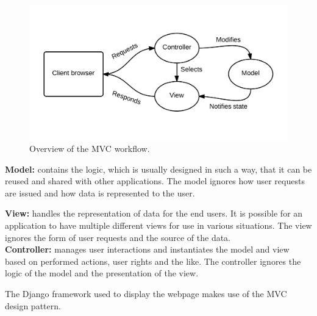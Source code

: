 \begin{figure}[ht]
\includegraphics[width=\textwidth]{img/mvc.png}
\caption{Overview of the MVC workflow.}
\label{fig:mvc}
\end{figure}

\textbf{Model:} contains the logic, which is usually designed in such a way, that it can be reused and shared with other applications.
The model ignores how user requests are issued and how data is represented to the user.\newline

\textbf{View:} handles the representation of data for the end users.
It is possible for an application to have multiple different views for use in various situations.
The view ignores the form of user requests and the source of the data.\\

\textbf{Controller:} manages user interactions and instantiates the model and view based on performed actions, user rights and the like.
The controller ignores the logic of the model and the presentation of the view.\newline

The Django framework used to display the webpage makes use of the MVC design pattern.